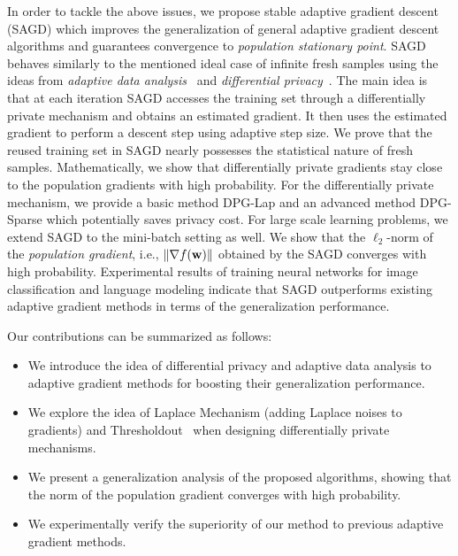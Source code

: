 \documentclass[11pt]{article}
\begin{document}
In order to tackle the above issues, we propose stable adaptive gradient descent (SAGD) which improves the generalization of general adaptive gradient descent algorithms and guarantees convergence to \emph{population stationary point}. 
SAGD behaves similarly to the mentioned ideal case of infinite fresh samples 
using the ideas from \emph{adaptive data analysis}~\citep{dwfe15} and \emph{differential privacy}~\citep{dwro2014}. The main idea %
is that at each iteration SAGD accesses the training set through a differentially private mechanism and obtains an estimated gradient. It then uses the estimated gradient to perform a descent step using adaptive step size. We prove that the reused training set in SAGD nearly possesses the statistical nature of fresh samples. Mathematically, we show that differentially private gradients stay close to the population gradients with high probability.
For the differentially private mechanism, we provide a basic method DPG-Lap and an advanced method DPG-Sparse which potentially saves privacy cost. 
For large scale learning problems, we extend SAGD to the mini-batch setting as well. 
We show that the $\ell_2$-norm of the \emph{population gradient}, i.e., $\|\nabla f(\mathbf{w})\|$ obtained by the SAGD converges with high probability. 
Experimental results of training neural networks for image classification and language modeling indicate that SAGD outperforms existing adaptive gradient methods in terms of the generalization performance.

Our  contributions  can be summarized as follows:
\begin{itemize}
    \item We introduce the idea of differential privacy and adaptive data analysis to adaptive gradient methods for boosting their generalization performance. 
    \item We explore the idea of Laplace Mechanism (adding Laplace noises to gradients) and Thresholdout~\citep{dwro2014} when designing differentially private mechanisms.
    \item We present a generalization analysis of the proposed algorithms, showing that the norm of the population gradient converges with high probability.
    \item We experimentally verify the superiority of our method to previous adaptive gradient methods.
\end{itemize}
\end{document}
